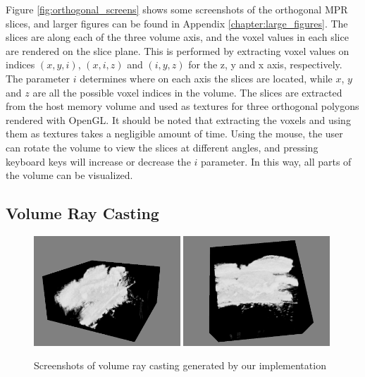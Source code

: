 Figure \ref{fig:orthogonal_screens} shows some screenshots of the orthogonal MPR slices, and larger figures can be found in Appendix \ref{chapter:large_figures}. The slices are along each of the three volume axis, and the voxel values in each slice are rendered on the slice plane. This is performed by extracting voxel values on indices $(x,y,i)$, $(x,i,z)$ and $(i,y,z)$ for the z, y and x axis, respectively. The parameter $i$ determines where on each axis the slices are located, while $x$, $y$ and $z$ are all the possible voxel indices in the volume. The slices are extracted from the host memory volume and used as textures for three orthogonal polygons rendered with OpenGL. It should be noted that extracting the voxels and using them as textures takes a negligible amount of time. Using the mouse, the user can rotate the volume to view the slices at different angles, and pressing keyboard keys will increase or decrease the $i$ parameter. In this way, all parts of the volume can be visualized.

\subsection{Volume Ray Casting}

\begin{figure}[h]
\centering
\includegraphics[width=0.49\textwidth]{graphics/raycast_screen0.png}
\includegraphics[width=0.49\textwidth]{graphics/raycast_screen1.png}
\caption[Screenshots of volume ray casting]{Screenshots of volume ray casting generated by our implementation}
\label{fig:raycast_screens}
\end{figure}

